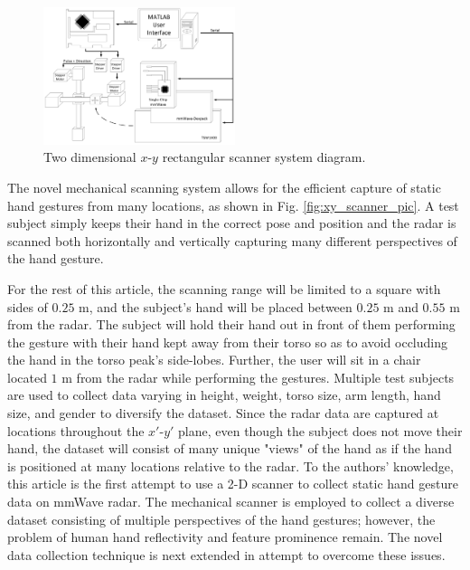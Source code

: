 \documentclass{ieeeaccess}
\begin{document}
\begin{figure}[h]
    \centering
    \includegraphics[width=0.5\textwidth]{xy_scanner_system_diagram.png}
    \caption{Two dimensional $x$-$y$ rectangular scanner system diagram.}
    \label{fig:xy_scanner_system_diagram}
\end{figure}

The novel mechanical scanning system allows for the efficient capture of static hand gestures from many locations, as shown in Fig. \ref{fig:xy_scanner_pic}. A test subject simply keeps their hand in the correct pose and position and the radar is scanned both horizontally and vertically capturing many different perspectives of the hand gesture. 

For the rest of this article, the scanning range will be limited to a square with sides of $0.25$ m, and the subject's hand will be placed between $0.25$ m and $0.55$ m from the radar. The subject will hold their hand out in front of them performing the gesture with their hand kept away from their torso so as to avoid occluding the hand in the torso peak's side-lobes. Further, the user will sit in a chair located $1$ m from the radar while performing the gestures. Multiple test subjects are used to collect data varying in height, weight, torso size, arm length, hand size, and gender to diversify the dataset. Since the radar data are captured at locations throughout the $x'$-$y'$ plane, even though the subject does not move their hand, the dataset will consist of many unique "views" of the hand as if the hand is positioned at many locations relative to the radar. To the authors' knowledge, this article is the first attempt to use a 2-D scanner to collect static hand gesture data on mmWave radar. The mechanical scanner is employed to collect a diverse dataset consisting of multiple perspectives of the hand gestures; however, the problem of human hand reflectivity and feature prominence remain. The novel data collection technique is next extended in attempt to overcome these issues.
\end{document}
